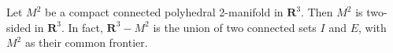 Let $M^2$ be a compact connected polyhedral 2-manifold in $\mathbf{R}^3$. Then $M^2$ is two-sided in $\mathbf{R}^3$. In fact, $\mathbf{R}^3 - M^2$ is the union of two connected sets $I$ and $E$, with $M^2$ as their common frontier.
